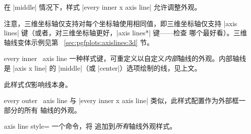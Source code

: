 \begin{pgfplotskeylist}
    在 |middle| 情况下，样式 |every inner x axis line| 允许调整外观。

    注意，三维坐标轴仅支持对每个坐标轴使用相同值，即三维坐标轴仅支持
    |axis lines| 键（或者，对三维坐标轴更好，|axis lines*| 键——检查
    哪个最好看）。三维轴线变体示例见第
    ~\ref{sec:pgfplots:axislines:3d} 节。
\end{pgfplotskeylist}

\begin{pgfplotsxykey}{every inner \x\ axis line}
\label{pgfplots:page:axislines}
    一种样式键，可重定义以自定义\emph{内部}轴线的外观。内部轴线是
    |axis x line| 的 |middle|（或 |center|）选项绘制的线，见上文。

    此样式\emph{仅}影响线本身。
\begin{codeexample}[]
\end{codeexample}
\end{pgfplotsxykey}

\begin{pgfplotsxykey}{every outer \x\ axis line}
    与 |every inner x axis line| 类似，此样式配置作为外部框一部分的所有
    轴线的外观。
\begin{codeexample}[]
\end{codeexample}
\end{pgfplotsxykey}

\begin{pgfplotskey}{axis line style=}
    一个命令，将  追加到\emph{所有}轴线外观样式。
\end{pgfplotskey}

